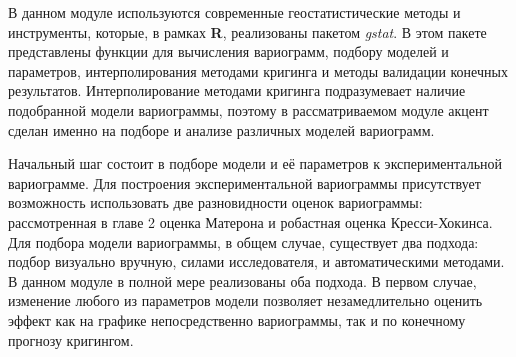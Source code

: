 В данном модуле используются современные геостатистические методы и инструменты, которые, в рамках \textbf{R}, реализованы пакетом \textit{gstat}. В этом пакете представлены функции для вычисления вариограмм, подбору моделей и параметров, интерполирования методами кригинга и методы валидации конечных результатов. Интерполирование методами кригинга подразумевает наличие подобранной модели вариограммы, поэтому в рассматриваемом модуле акцент сделан именно на подборе и анализе различных моделей вариограмм.

Начальный шаг состоит в подборе модели и её параметров к экспериментальной вариограмме. Для построения экспериментальной вариограммы присутствует возможность использовать две разновидности оценок вариограммы: рассмотренная в главе 2 оценка Матерона и робастная оценка Кресси-Хокинса. Для подбора модели вариограммы, в общем случае, существует два подхода: подбор визуально вручную, силами исследователя, и автоматическими методами. В данном модуле в полной мере реализованы оба подхода. В первом случае, изменение любого из параметров модели позволяет незамедлительно оценить эффект как на графике непосредственно вариограммы, так и по конечному прогнозу кригингом.

